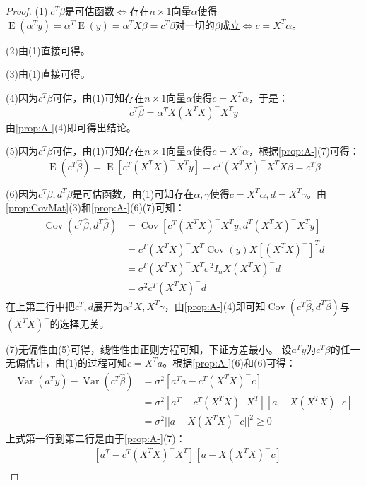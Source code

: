 \begin{proof}
	(1)$\;c^T\beta$是可估函数$\Leftrightarrow$存在$n\times1$向量$\alpha$使得$\operatorname{E}(\alpha^Ty)=\alpha^T\operatorname{E}(y)=\alpha^TX\beta=c^T\beta$对一切的$\beta$成立$\Leftrightarrow c=X^T\alpha$。\par
	(2)由(1)直接可得。\par
	(3)由(1)直接可得。\par
	(4)因为$c^T\beta$可估，由(1)可知存在$n\times 1$向量$\alpha$使得$c=X^T\alpha$，于是：
	\begin{equation*}
		c^T\hat{\beta}=\alpha^TX(X^TX)^-X^Ty
	\end{equation*}
	由\cref{prop:A-}(4)即可得出结论。\par
	(5)因为$c^T\beta$可估，由(1)可知存在$n\times 1$向量$\alpha$使得$c=X^T\alpha$，根据\cref{prop:A-}(7)可得：
	\begin{equation*}
		\operatorname{E}(c^T\hat{\beta})=\operatorname{E}[c^T(X^TX)^-X^Ty]=c^T(X^TX)^-X^TX\beta=c^T\beta
	\end{equation*}\par
	(6)因为$c^T\beta,d^T\beta$是可估函数，由(1)可知存在$\alpha,\gamma$使得$c=X^T\alpha,d=X^T\gamma$。由\cref{prop:CovMat}(3)和\cref{prop:A-}(6)(7)可知：
	\begin{align*}
		\operatorname{Cov}(c^T\hat{\beta},d^T\hat{\beta})
		&=\operatorname{Cov}[c^T(X^TX)^-X^Ty,d^T(X^TX)^-X^Ty] \\
		&=c^T(X^TX)^-X^T\operatorname{Cov}(y)X[(X^TX)^-]^Td \\
		&=c^T(X^TX)^-X^T\sigma^2I_nX(X^TX)^-d \\
		&=\sigma^2c^T(X^TX)^-d
	\end{align*}
	在上第三行中把$c^T,d$展开为$\alpha^TX,X^T\gamma$，由\cref{prop:A-}(4)即可知$\operatorname{Cov}(c^T\hat{\beta},d^T\hat{\beta})$与$(X^TX)^-$的选择无关。\par
	(7)无偏性由(5)可得，线性性由正则方程可知，下证方差最小。
	设$a^Ty$为$c^T\beta$的任一无偏估计，由(1)的过程可知$c=X^Ta$。根据\cref{prop:A-}(6)和(6)可得：
	\begin{align*}
		\operatorname{Var}(a^Ty)-\operatorname{Var}(c^T\hat{\beta})&=\sigma^2[a^Ta-c^T(X^TX)^-c] \\
		&=\sigma^2[a^T-c^T(X^TX)^-X^T][a-X(X^TX)^-c] \\
		&=\sigma^2||a-X(X^TX)^-c||^2\geqslant0
	\end{align*}
	上式第一行到第二行是由于\cref{prop:A-}(7)：
	\begin{align*}
		&[a^T-c^T(X^TX)^-X^T][a-X(X^TX)^-c] \\

\end{align*}
\end{proof}
